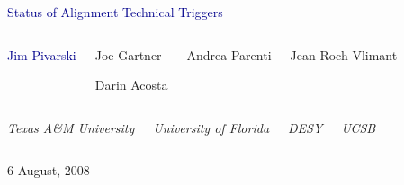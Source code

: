 \documentclass[compress]{beamer}
\begin{document}
\begin{frame}
\vfill
\begin{center}
\textcolor{darkblue}{\Large Status of Alignment Technical Triggers}

\vfill
\begin{columns}
\begin{center}
\large
\textcolor{darkblue}{Jim Pivarski}

\vspace{0.4 cm}
\mbox{ }
\end{center}

\begin{center}
\large
Joe Gartner

\vspace{0.4 cm}
Darin Acosta
\end{center}

\begin{center}
\large
Andrea Parenti

\vspace{0.4 cm}
\mbox{ }
\end{center}

\begin{center}
\large
Jean-Roch Vlimant

\vspace{0.4 cm}
\mbox{ }
\end{center}
\end{columns}

\begin{columns}
\begin{center}
\scriptsize
{\it Texas A\&M University}
\end{center}

\begin{center}
\scriptsize
{\it University of Florida}
\end{center}

\begin{center}
\scriptsize
{\it DESY}
\end{center}

\begin{center}
\scriptsize
{\it UCSB}
\end{center}
\end{columns}

\vfill
 6 August, 2008

\end{center}
\end{frame}
\end{document}

